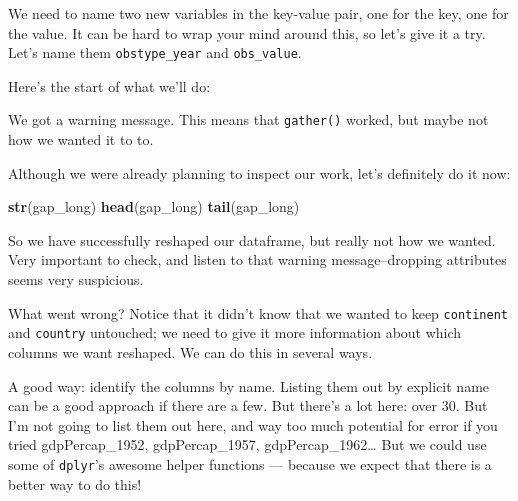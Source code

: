 \documentclass[]{book}
\newenvironment{Shaded}{\begin{snugshade}}{\end{snugshade}}
\newcommand{\KeywordTok}[1]{\textcolor[rgb]{0.13,0.29,0.53}{\textbf{{#1}}}}
\newcommand{\DataTypeTok}[1]{\textcolor[rgb]{0.13,0.29,0.53}{{#1}}}
\newcommand{\StringTok}[1]{\textcolor[rgb]{0.31,0.60,0.02}{{#1}}}
\newcommand{\NormalTok}[1]{{#1}}
\theoremstyle{definition}
\theoremstyle{definition}
\theoremstyle{definition}
\theoremstyle{remark}
\begin{document}
We need to name two new variables in the key-value pair, one for the
key, one for the value. It can be hard to wrap your mind around this, so
let's give it a try. Let's name them \texttt{obstype\_year} and
\texttt{obs\_value}.

Here's the start of what we'll do:

\begin{Shaded}
\end{Shaded}

We got a warning message. This means that \texttt{gather()} worked, but
maybe not how we wanted it to to.

Although we were already planning to inspect our work, let's definitely
do it now:

\begin{Shaded}
\begin{Highlighting}[]
\KeywordTok{str}\NormalTok{(gap_long)}
\KeywordTok{head}\NormalTok{(gap_long)}
\KeywordTok{tail}\NormalTok{(gap_long)}
\end{Highlighting}
\end{Shaded}

So we have successfully reshaped our dataframe, but really not how we
wanted. Very important to check, and listen to that warning
message--dropping attributes seems very suspicious.

What went wrong? Notice that it didn't know that we wanted to keep
\texttt{continent} and \texttt{country} untouched; we need to give it
more information about which columns we want reshaped. We can do this in
several ways.

A good way: identify the columns by name. Listing them out by explicit
name can be a good approach if there are a few. But there's a lot here:
over 30. But I'm not going to list them out here, and way too much
potential for error if you tried gdpPercap\_1952, gdpPercap\_1957,
gdpPercap\_1962\ldots{} But we could use some of \texttt{dplyr}'s
awesome helper functions --- because we expect that there is a better
way to do this!
\end{document}
